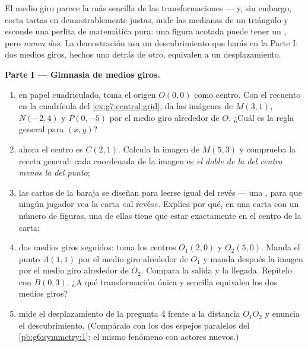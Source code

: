 \begin{problem}
\label{pb:g7:central:1}
El medio giro parece la más sencilla de las transformaciones --- y, sin embargo,
corta tartas en  demostrablemente justas, mide las medianas de
un triángulo y esconde una perlita de matemática pura: una
figura acotada puede tener un , pero \emph{nunca
dos}. La demostración usa un descubrimiento que harás en la Parte I: dos
medios giros, hechos uno detrás de otro, equivalen a un desplazamiento.

\medskip
\noindent\textbf{Parte I --- Gimnasia de medios giros.}
\begin{enumerate}
  \item en papel cuadriculado, toma el origen $O(0, 0)$ como centro.
        Con el recuento en la cuadrícula del \cref{ex:g7:central:grid},
        da las imágenes de $M(3, 1)$, $N(-2, 4)$ y
        $P(0, -5)$ por el medio giro alrededor de $O$. ¿Cuál es la
        regla general para $(x, y)$?
  \item ahora el centro es $C(2, 1)$. Calcula la imagen de
        $M(5, 3)$ y comprueba la receta general: cada coordenada
        de la imagen es \emph{el doble de la del centro menos la
        del punto};
  \item las cartas de la baraja se diseñan para leerse igual del revés
        --- una , para que ningún jugador vea la carta
        «al revés». Explica por qué, en una carta con un número
        \emph{} de figuras, una de ellas tiene que estar exactamente en el
        centro de la carta;
  \item dos medios giros seguidos: toma los centros $O_1(2, 0)$
        y $O_2(5, 0)$. Manda el punto $A(1, 1)$ por el
        medio giro alrededor de $O_1$ y manda después la imagen por el
        medio giro alrededor de $O_2$. Compara la salida y la llegada. Repítelo
        con $B(0, 3)$. ¿A qué transformación única y sencilla equivalen
        los dos medios giros?
  \item mide el desplazamiento de la pregunta 4 frente a la distancia
        $O_1 O_2$ y enuncia el descubrimiento. (Compáralo con los
        dos espejos paralelos del \cref{pb:g6:symmetry:1}: el mismo
        fenómeno con actores nuevos.)
\end{enumerate}


\end{problem}

